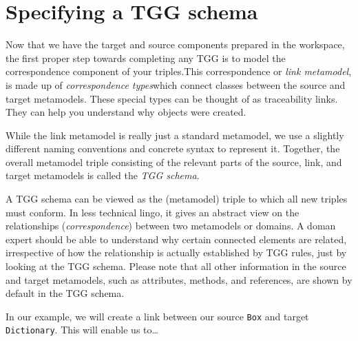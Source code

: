 \newpage
\hypertarget{TGGSchema}{}
\section{Specifying a TGG schema}
\genHeader

Now that we have the target and source components prepared in the workspace, the first proper step towards completing any TGG is to model the
correspondence component of your triples.This correspondence or \emph{link metamodel}, is made up of \emph{correspondence
types}which connect classes between the source and target metamodels. These special types can be thought of as traceability
links. They can help you understand why objects were created.

While the link metamodel is really just a standard metamodel, we use a slightly different naming conventions and concrete syntax to represent it. Together, the overall metamodel triple consisting of the relevant parts of the source, link, and target metamodels is called the \emph{TGG
schema}.

A TGG schema can be viewed as the (metamodel) triple to which all new triples must conform. In less technical lingo, it gives an abstract view on the
relationships (\emph{correspondence}) between two metamodels or domains. A doman expert should be able to understand why certain connected elements are related,
irrespective of how the relationship is actually established by TGG rules, just by looking at the TGG schema. Please note that all other information in the
source and target metamodels, such as attributes, methods, and references, are shown by default in the TGG schema.

In our example, we will create a link between our source \texttt{Box} and target \texttt{Dictionary}. This will enable us to\ldots





